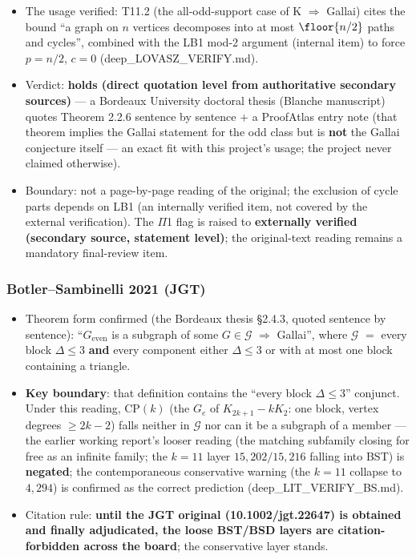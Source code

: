 \begin{itemize}
\item The usage verified: T11.2 (the all-odd-support case of
K $\Rightarrow$ Gallai) cites the bound ``a graph on $n$ vertices
decomposes into at most $\floor{n/2}$ paths and cycles'', combined with the
LB1 mod-2 argument (internal item) to force $p=n/2$, $c=0$
(deep\_LOVASZ\_VERIFY.md).
\item Verdict: \textbf{holds (direct quotation level from authoritative
secondary sources)} --- a Bordeaux University doctoral thesis (Blanche
manuscript) quotes Theorem 2.2.6 sentence by sentence $+$ a ProofAtlas
entry note (that theorem implies the Gallai statement for the odd class but
is \textbf{not} the Gallai conjecture itself --- an exact fit with this
project's usage; the project never claimed otherwise).
\item Boundary: not a page-by-page reading of the original; the exclusion of
cycle parts depends on LB1 (an internally verified item, not covered by the
external verification). The $\Pi$1 flag is raised to \textbf{externally
verified (secondary source, statement level)}; the original-text reading
remains a mandatory final-review item.
\end{itemize}

\subsubsection{Botler--Sambinelli 2021 (JGT)}\label{subsec:add-litbs}

\begin{itemize}
\item Theorem form confirmed (the Bordeaux thesis \S2.4.3, quoted sentence
by sentence): ``$G_\mathrm{even}$ is a subgraph of some $G\in\mathcal{G}$
$\Rightarrow$ Gallai'', where $\mathcal{G}$ $=$ every block $\Delta\le3$
\textbf{and} every component either $\Delta\le3$ or with at most one block
containing a triangle.
\item \textbf{Key boundary}: that definition contains the ``every block
$\Delta\le3$'' conjunct. Under this reading, CP$(k)$ (the $G_e$ of
$K_{2k+1}-kK_2$: one block, vertex degrees $\ge2k-2$) falls neither in
$\mathcal{G}$ nor can it be a subgraph of a member --- the earlier working
report's looser reading (the matching subfamily closing for free as an
infinite family; the $k=11$ layer $15{,}202/15{,}216$ falling into BST) is
\textbf{negated}; the contemporaneous conservative warning (the $k=11$
collapse to $4{,}294$) is confirmed as the correct prediction
(deep\_LIT\_VERIFY\_BS.md).
\item Citation rule: \textbf{until the JGT original (10.1002/jgt.22647) is
obtained and finally adjudicated, the loose BST/BSD layers are
citation-forbidden across the board}; the conservative layer stands.
\end{itemize}

